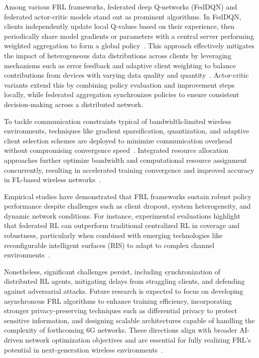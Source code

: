\documentclass[sigconf]{acmart}
\begin{document}
Among various FRL frameworks, federated deep Q-networks (FedDQN) and federated actor-critic models stand out as prominent algorithms. In FedDQN, clients independently update local Q-values based on their experience, then periodically share model gradients or parameters with a central server performing weighted aggregation to form a global policy~\cite{ref49}. This approach effectively mitigates the impact of heterogeneous data distributions across clients by leveraging mechanisms such as error feedback and adaptive client weighting to balance contributions from devices with varying data quality and quantity~\cite{ref49}. Actor-critic variants extend this by combining policy evaluation and improvement steps locally, while federated aggregation synchronizes policies to ensure consistent decision-making across a distributed network.

To tackle communication constraints typical of bandwidth-limited wireless environments, techniques like gradient sparsification, quantization, and adaptive client selection schemes are deployed to minimize communication overhead without compromising convergence speed~\cite{ref49}. Integrated resource allocation approaches further optimize bandwidth and computational resource assignment concurrently, resulting in accelerated training convergence and improved accuracy in FL-based wireless networks~\cite{ref50}.

Empirical studies have demonstrated that FRL frameworks sustain robust policy performance despite challenges such as client dropout, system heterogeneity, and dynamic network conditions. For instance, experimental evaluations highlight that federated RL can outperform traditional centralized RL in coverage and robustness, particularly when combined with emerging technologies like reconfigurable intelligent surfaces (RIS) to adapt to complex channel environments~\cite{ref49}.

Nonetheless, significant challenges persist, including synchronization of distributed RL agents, mitigating delays from straggling clients, and defending against adversarial attacks. Future research is expected to focus on developing asynchronous FRL algorithms to enhance training efficiency, incorporating stronger privacy-preserving techniques such as differential privacy to protect sensitive information, and designing scalable architectures capable of handling the complexity of forthcoming 6G networks. These directions align with broader AI-driven network optimization objectives and are essential for fully realizing FRL’s potential in next-generation wireless environments~\cite{ref50}.
\end{document}
